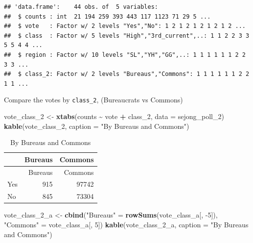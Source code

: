 \documentclass[
]{article}
\newenvironment{Shaded}{\begin{snugshade}}{\end{snugshade}}
\newcommand{\DataTypeTok}[1]{\textcolor[rgb]{0.13,0.29,0.53}{#1}}
\newcommand{\DecValTok}[1]{\textcolor[rgb]{0.00,0.00,0.81}{#1}}
\newcommand{\KeywordTok}[1]{\textcolor[rgb]{0.13,0.29,0.53}{\textbf{#1}}}
\newcommand{\NormalTok}[1]{#1}
\newcommand{\OperatorTok}[1]{\textcolor[rgb]{0.81,0.36,0.00}{\textbf{#1}}}
\newcommand{\StringTok}[1]{\textcolor[rgb]{0.31,0.60,0.02}{#1}}
\begin{document}
\begin{verbatim}
## 'data.frame':    44 obs. of  5 variables:
##  $ counts : int  21 194 259 393 443 117 1123 71 29 5 ...
##  $ vote   : Factor w/ 2 levels "Yes","No": 1 2 1 2 1 2 1 2 1 2 ...
##  $ class  : Factor w/ 5 levels "High","3rd_current",..: 1 1 2 2 3 3 5 5 4 4 ...
##  $ region : Factor w/ 10 levels "SL","YH","GG",..: 1 1 1 1 1 1 2 2 3 3 ...
##  $ class_2: Factor w/ 2 levels "Bureaus","Commons": 1 1 1 1 1 1 2 2 1 1 ...
\end{verbatim}

Compare the votes by \texttt{class\_2}, (Bureaucrats vs Commons)

\begin{Shaded}
\begin{Highlighting}[]
\NormalTok{vote\_class\_}\DecValTok{2}\NormalTok{ \textless{}{-}}\StringTok{ }\KeywordTok{xtabs}\NormalTok{(counts }\OperatorTok{\textasciitilde{}}\StringTok{ }\NormalTok{vote }\OperatorTok{+}\StringTok{ }\NormalTok{class\_}\DecValTok{2}\NormalTok{, }
                      \DataTypeTok{data =}\NormalTok{ sejong\_poll\_}\DecValTok{2}\NormalTok{)}
\KeywordTok{kable}\NormalTok{(vote\_class\_}\DecValTok{2}\NormalTok{, }\DataTypeTok{caption =} \StringTok{"By Bureaus and Commons"}\NormalTok{)}
\end{Highlighting}
\end{Shaded}

\begin{longtable}[]{@{}lrr@{}}
\caption{By Bureaus and Commons}\tabularnewline
\toprule
& Bureaus & Commons\tabularnewline
\midrule
\endfirsthead
\toprule
& Bureaus & Commons\tabularnewline
\midrule
\endhead
Yes & 915 & 97742\tabularnewline
No & 845 & 73304\tabularnewline
\bottomrule
\end{longtable}

\begin{Shaded}
\begin{Highlighting}[]
\NormalTok{vote\_class\_}\DecValTok{2}\NormalTok{\_a \textless{}{-}}\StringTok{ }\KeywordTok{cbind}\NormalTok{(}\StringTok{"Bureaus"}\NormalTok{ =}\StringTok{ }\KeywordTok{rowSums}\NormalTok{(vote\_class\_a[, }\DecValTok{{-}5}\NormalTok{]), }\StringTok{"Commons"}\NormalTok{ =}\StringTok{  }\NormalTok{vote\_class\_a[, }\DecValTok{5}\NormalTok{])}
\KeywordTok{kable}\NormalTok{(vote\_class\_}\DecValTok{2}\NormalTok{\_a, }\DataTypeTok{caption =} \StringTok{"By Bureaus and Commons"}\NormalTok{)}
\end{Highlighting}
\end{Shaded}
\end{document}
